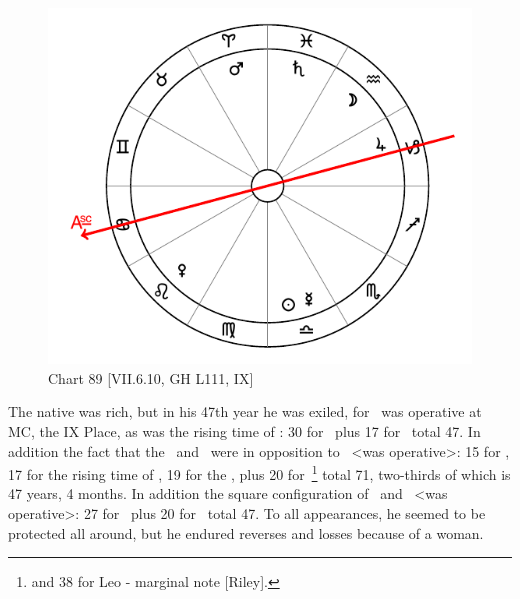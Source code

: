 \begin{figure}
\centering
\vspace{0pt}
\includegraphics[width=.68\textwidth]{charts/7_6_10}
\caption{Chart 89 [VII.6.10, GH L111, IX] }
\label{fig:chart89}
\end{figure} 

The native was rich, but in his 47th year he was exiled, for \Saturn\, was operative at MC, the IX Place, as was the rising time of \Pisces: 30 for \Saturn\, plus 17 for \Pisces\, total 47. In addition the fact that the \Sun\, and \Mercury\, were in opposition to \Mars\, <was operative>: 15 for \Mars, 17 for the rising time of \Aries, 19 for the \Sun, plus 20 for \Mercury\,\footnote{and 38 for Leo - marginal note [Riley].} total 71, two-thirds of which is 47 years, 4 months. In addition the square configuration of \Libra\, and \Capricorn\, <was operative>: 27 for \Capricorn\, plus 20 for \Libra\, total 47. To all appearances, he seemed to be protected all around, but he endured reverses and losses because of a woman.

